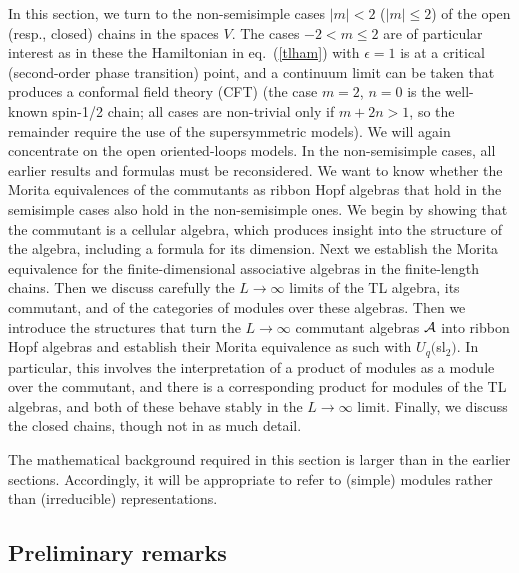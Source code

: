 \documentclass[twocolumn,floats,pra]{revtex4}
\def \cA {{\cal A}}
\begin{document}
In this section, we turn to the non-semisimple cases $|m|<2$
($|m|\leq 2$) of the open (resp., closed) chains in the spaces
$V$. The cases $-2<m\leq 2$ are of particular interest as in these
the Hamiltonian in eq.\ (\ref{tlham}) with $\epsilon=1$ is at a
critical (second-order phase transition) point, and a continuum
limit can be taken that produces a conformal field theory (CFT)
\cite{glr,rs} (the case $m=2$, $n=0$ is the well-known spin-1/2
chain; all cases are non-trivial only if $m+2n>1$, so the
remainder require the use of the supersymmetric models). We will
again concentrate on the open oriented-loops models. In the
non-semisimple cases, all earlier results and formulas must be
reconsidered. We want to know whether the Morita equivalences of
the commutants as ribbon Hopf algebras that hold in the semisimple
cases also hold in the non-semisimple ones. We begin by showing
that the commutant is a cellular algebra, which produces insight
into the structure of the algebra, including a formula for its
dimension. Next we establish the Morita equivalence for the
finite-dimensional associative algebras in the finite-length
chains. Then we discuss carefully the $L\to\infty$ limits of the
TL algebra, its commutant, and of the categories of modules over
these algebras. Then we introduce the structures that turn the
$L\to\infty$ commutant algebras $\cA$ into ribbon Hopf algebras
and establish their Morita equivalence as such with $U_q($sl$_2)$.
In particular, this involves the interpretation of a product of
modules as a module over the commutant, and there is a
corresponding product for modules of the TL algebras, and both of
these behave stably in the $L\to\infty$ limit. Finally, we discuss
the closed chains, though not in as much detail.

The mathematical background required in this section is larger
than in the earlier sections. Accordingly, it will be appropriate
to refer to (simple) modules rather than (irreducible)
representations.

\subsection{Preliminary remarks}
\end{document}
